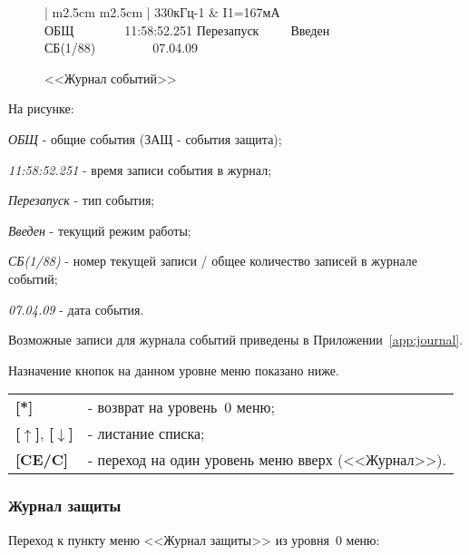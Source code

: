  \begin{figure}[H]
 	\centering
 	
	\begin{tabular}{| m{2.5cm}  m{2.5cm} |}
		\firsthline
		330кГц-1	& \raggedleft I1=167мА				\tabularnewline 
		 {ОБЩ~~~~~~~~11:58:52.251} 	\tabularnewline
		  {Перезапуск~~~~~Введен} 	\tabularnewline 
		 {СБ(1/88)~~~~~~~~~07.04.09}\tabularnewline 
		\lasthline
	\end{tabular} 
	
	\caption{<<Журнал событий>>}
	\label{fig:journal_event}
\end{figure}

\begin{ESKDexplanation}[1.5cm]
	\item[На рисунке:]
	\item \textit{ОБЩ} - общие события (ЗАЩ - события защита);
	\item \textit{11:58:52.251} - время записи события в журнал;
	\item \textit{Перезапуск} - тип события;
	\item \textit{Введен} - текущий режим работы;
	\item \textit{СБ(1/88)} - номер текущей записи / общее количество записей в журнале событий;
	\item \textit{07.04.09} - дата события.
\end{ESKDexplanation}

Возможные записи для журнала событий приведены в Приложении~\ref{app:journal}.

Назначение кнопок на данном уровне меню показано ниже.
\begin{center}
	\begin{tabular}{p{2cm} p{15cm}}
		\textbf{[*]} & - возврат на уровень~0 меню; \tabularnewline
		\textbf{[$\uparrow$]}, \textbf{[$\downarrow$]}  & - листание списка; \tabularnewline
		\textbf{[CE/C]} & - переход на один уровень меню вверх (<<Журнал>>). \tabularnewline				
	\end{tabular}
\end{center} 


\subsubsection{Журнал защиты} \label{sssec:journal_def}

Переход к пункту меню <<Журнал защиты>> из уровня~0 меню: 

